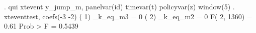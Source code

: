 . qui xtevent y_jump_m, panelvar(id) timevar(t) policyvar(z) window(5)
{\smallskip}
. xteventtest, coefs(-3 -2) 
{\smallskip}
 ( 1)  _k_eq_m3 = 0
 ( 2)  _k_eq_m2 = 0
{\smallskip}
       F(  2,  1360) =    0.61
            Prob > F =    0.5439
{\smallskip}
